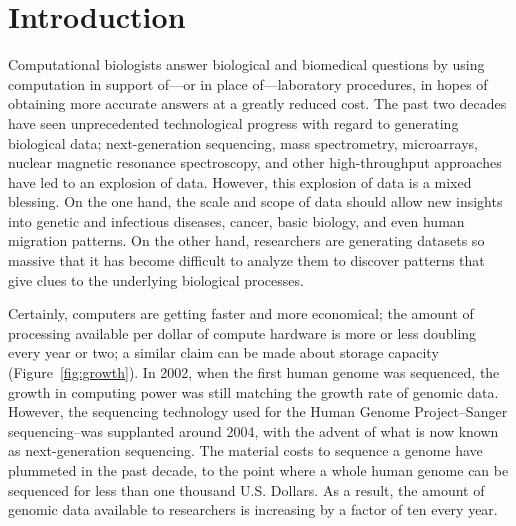 \documentclass{acm_proc_article-sp}
\begin{document}





\section{Introduction}

Computational biologists answer biological and biomedical 
questions by using computation in support of---or in place of---laboratory 
procedures, in hopes of obtaining more accurate answers at a greatly reduced 
cost.
The past two decades have seen unprecedented technological progress with regard
to generating biological data; next-generation sequencing, mass spectrometry,
microarrays, nuclear magnetic resonance spectroscopy, and other high-throughput 
approaches have led to an explosion of data.
However, this explosion of data is a mixed blessing.
On the one hand, the scale and scope of data should allow new insights into
genetic and infectious diseases, cancer, basic biology, and even human migration
patterns.
On the other hand, researchers are generating datasets so massive that it has 
become difficult to analyze them to discover patterns that give clues to the 
underlying biological processes.

Certainly, computers are getting faster and more economical; the amount of 
processing available per dollar of compute hardware is more or less doubling 
every year or two; a similar claim can be made about storage capacity 
(Figure~\ref{fig:growth}).
In 2002, when the first human genome was sequenced, the growth in computing 
power was still matching the growth rate of genomic data.
However, the sequencing technology used for the Human Genome Project--Sanger
sequencing--was supplanted around 2004, with the advent of what is now known as 
next-generation sequencing.
The material costs to sequence a genome have plummeted in the past
decade, to the point where a whole human genome can be sequenced for less than
one thousand U.S. Dollars.
As a result, the amount of genomic data available to 
researchers is increasing by a factor of ten every year.
\end{document}

